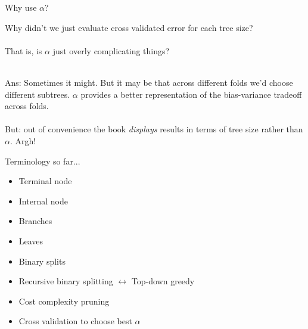 \documentclass[mathserif, aspectratio=169]{beamer}
\begin{document}
\begin{frame}{Why use $\alpha$?}

Why didn't we just evaluate cross validated error for each tree size?\\~\\

That is, is $\alpha$ just overly complicating things?\\~\\

\pause

Ans: Sometimes it might.  But it may be that across different folds we'd choose different subtrees.  $\alpha$ provides a better representation of the bias-variance tradeoff across folds.  \\~\\

But: out of convenience the book \textit{displays} results in terms of tree size rather than $\alpha$.  Argh!

\end{frame}


\begin{frame}{Terminology so far...}
	\begin{itemize}
		\item Terminal node
		\item Internal node
		\item Branches
		\item Leaves
		\item Binary splits
		\item Recursive binary splitting $\leftrightarrow$ Top-down greedy 
		\pause
		\item Cost complexity pruning
		\item Cross validation to choose best $\alpha$
	\end{itemize}
\end{frame}
\end{document}
